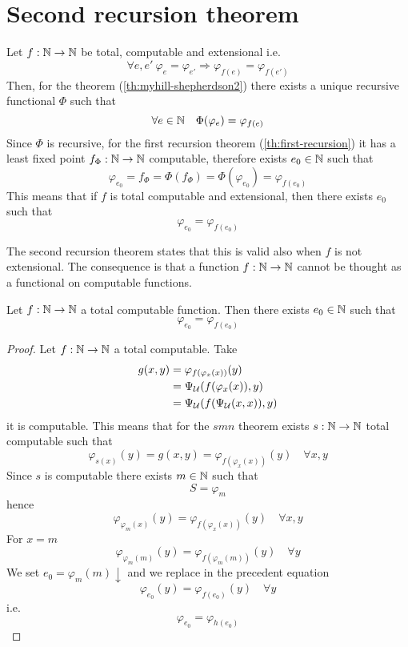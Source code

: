\chapter{Second recursion theorem}
Let $f:\mathbb{N} \to \mathbb{N}$ be total, computable and extensional i.e.
\[
\forall e, e'\ \varphi_e=\varphi_{e'}\Rightarrow\varphi_{f(e)}=\varphi_{f(e')}
\] 
Then, for the
theorem (\ref{th:myhill-shepherdson2}) there exists a unique recursive
functional $\Phi$ such that
\[ \forall e \in \mathbb{N} \quad \Phi(\varphi_e) = \varphi_{f(e)} \] Since $\Phi$ is
recursive, for the first recursion theorem (\ref{th:first-recursion})
it has a least fixed point $f_\Phi :\mathbb{N} \to \mathbb{N}$ computable, therefore exists
$e_0\in \mathbb{N}$ such that
\[
  \varphi_{e_0} = f_\Phi = \Phi(f_\Phi) = \Phi(\varphi_{e_0}) = \varphi_{f(e_0)}
\]
This means that if $f$ is total computable and extensional, then there
exists $e_0$ such that \[\varphi_{e_0} = \varphi_{f(e_0)}\]

The second recursion
theorem states that this is valid also when $f$ is not extensional. The
consequence is that a function $f : \mathbb{N} \to \mathbb{N}$ cannot be thought as a
functional on computable functions.
\begin{theorem}\label{th:second-recursion}
  Let $f : \mathbb{N} \to \mathbb{N}$ a total computable function. Then there exists
  $e_0 \in \mathbb{N}$ such that
  \[
    \varphi_{e_0} = \varphi_{f(e_0)}
  \]
  \begin{proof}
    Let $f : \mathbb{N} \to \mathbb{N}$ a total computable.
    Take
    \begin{align*}
      g(x,y) &= \varphi_{f(\varphi_x(x))}(y)\\
             &= \Psi_{\mathcal{U}}(f(\varphi_x(x)), y)     \\
             &= \Psi_{\mathcal{U}}(f(\Psi_{\mathcal{U}}(x,x)), y) 
    \end{align*}
    it is computable. This means that for the
    $smn$ theorem exists $s : \mathbb{N} \to \mathbb{N}$ total computable such that
    \[
      \varphi_{s(x)}(y) = g(x,y) = \varphi_{f(\varphi_x(x))}(y) \quad \forall x,y
    \]
    Since $s$ is computable there exists $m\in\mathbb{N}$ such that 
    \[
    S = \varphi_m
    \]
    hence
    \[
      \varphi_{\varphi_m(x)}(y) = \varphi_{f(\varphi_x(x))}(y) \quad \forall x,y
    \]
    For $x=m$
    \[
      \varphi_{\varphi_m(m)}(y) = \varphi_{f(\varphi_m(m))}(y) \quad \forall y
    \]
    We set $e_0 = \varphi_m(m)\downarrow$ and we replace in the precedent equation
    \[
       \varphi_{e_0}(y) = \varphi_{f(e_0)}(y) \quad \forall y
    \]
    i.e.
    \[
      \varphi_{e_0} = \varphi_{h(e_0)}
    \]
  \end{proof}
\end{theorem}

